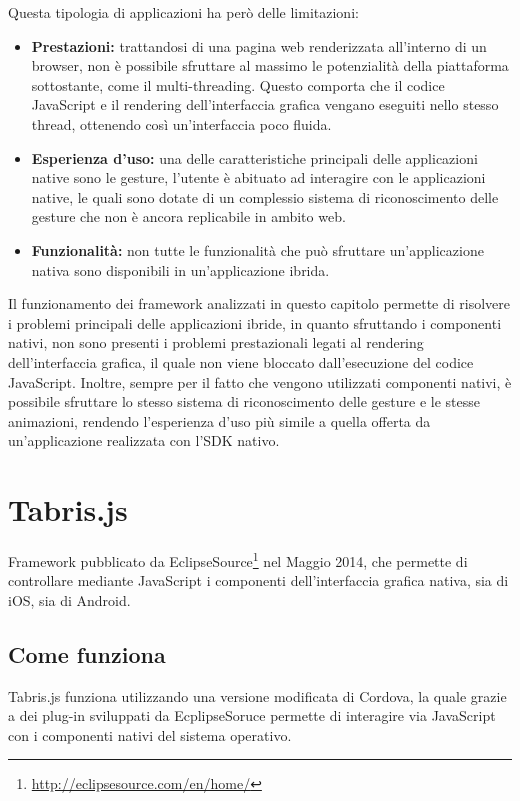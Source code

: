 Questa tipologia di applicazioni ha però delle limitazioni:
\begin{itemize}
\item \textbf{Prestazioni:} trattandosi di una pagina web renderizzata all'interno di un browser, non è possibile sfruttare al massimo le potenzialità della piattaforma sottostante, come il multi-threading. Questo comporta che il codice JavaScript e il \gls{rendering} dell'interfaccia grafica vengano eseguiti nello stesso thread, ottenendo così un'interfaccia poco fluida.
\item \textbf{Esperienza d'uso:} una delle caratteristiche principali delle applicazioni native sono le \gls{gesture}, l'utente è abituato ad interagire con le applicazioni native, le quali sono dotate di un complessio sistema di riconoscimento delle gesture che non è ancora replicabile in ambito web.
\item \textbf{Funzionalità:} non tutte le funzionalità che può sfruttare un'applicazione nativa sono disponibili in un'applicazione ibrida.
\end{itemize}

Il funzionamento dei framework analizzati in questo capitolo permette di risolvere i problemi principali delle applicazioni ibride, in quanto sfruttando i componenti nativi, non sono presenti i problemi prestazionali legati al rendering dell'interfaccia grafica, il quale non viene bloccato dall'esecuzione del codice JavaScript. Inoltre, sempre per il fatto che  vengono utilizzati componenti nativi, è possibile sfruttare lo stesso sistema di riconoscimento delle gesture e le stesse animazioni, rendendo l'esperienza d'uso più simile a quella offerta da un'applicazione realizzata con l'SDK nativo.

\section{Tabris.js}

Framework pubblicato da EclipseSource\footnote{\url{http://eclipsesource.com/en/home/}} nel Maggio 2014, che permette di controllare mediante JavaScript i componenti dell'interfaccia grafica nativa, sia di iOS, sia di Android.

\subsection{Come funziona}
Tabris.js funziona utilizzando una versione modificata di Cordova, la quale grazie a dei plug-in sviluppati da EcplipseSoruce permette di interagire via JavaScript con i componenti nativi del sistema operativo.

